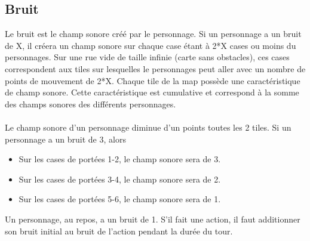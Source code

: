 \subsection{Bruit}
Le bruit est le champ sonore créé par le personnage. Si un personnage a un bruit de X, il créera un champ sonore sur chaque case étant à 2*X cases ou moins du personnages. Sur une rue vide de taille infinie (carte sans obstacles), ces cases correspondent aux tiles sur lesquelles le personnages peut aller avec un nombre de points de mouvement de 2*X. Chaque tile de la map possède une caractéristique de champ sonore. Cette caractéristique est cumulative et correspond à la somme des champs sonores des différents personnages. 
\\\\
Le champ sonore d'un personnage diminue d'un points toutes les 2 tiles. Si un personnage a un bruit de 3, alors
\begin{itemize}
   \item Sur les cases de portées 1-2, le champ sonore sera de 3.
   \item Sur les cases de portées 3-4, le champ sonore sera de 2.
   \item Sur les cases de portées 5-6, le champ sonore sera de 1.
\end{itemize} 
Un personnage, au repos, a un bruit de 1. S'il fait une action, il faut additionner son bruit initial au bruit de l'action pendant la durée du tour.
